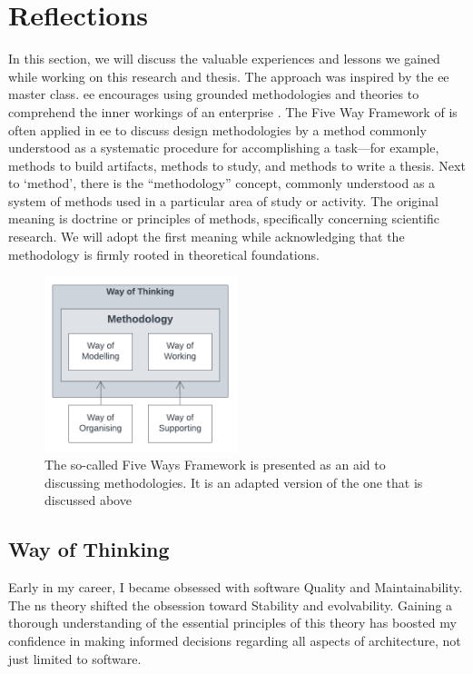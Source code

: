 \section{Reflections} \label{chap_reflection}

In this section, we will discuss the valuable experiences and lessons we gained while
working on this research and thesis. The approach was inspired by the \gls{ee} master
class. \gls{ee} encourages using grounded methodologies and theories to comprehend the
inner workings of an enterprise \parencite[262]{dietz_enterprise_2020}. The Five Way
Framework of \textcite{wijers1989analyzing} is often applied in \gls{ee} to discuss design
methodologies by a method commonly understood as a systematic procedure for accomplishing
a task—for example, methods to build artifacts, methods to study, and methods to write a
thesis. Next to \enquote*{method}, there is the \enquote{methodology} concept, commonly
understood as a system of methods used in a particular area of study or activity. The
original meaning is doctrine or principles of methods, specifically concerning scientific
research. We will adopt the first meaning while acknowledging that the methodology is
firmly rooted in theoretical foundations.

\begin{figure}[H]
    \centering
    \includegraphics[width=0.5\textwidth]{figures/5ways.pdf}
    \caption[The Five Way Framework]{The so-called Five Ways Framework is presented as an aid to discussing methodologies. It is an adapted version of the one that is discussed above}
    \label{fig_5ways}
\end{figure}

\subsection{Way of Thinking}

Early in my career, I became obsessed with software Quality and Maintainability. The
\gls{ns} theory shifted the obsession toward Stability and evolvability. Gaining a
thorough understanding of the essential principles of this theory has boosted my
confidence in making informed decisions regarding all aspects of architecture, not just
limited to software.

